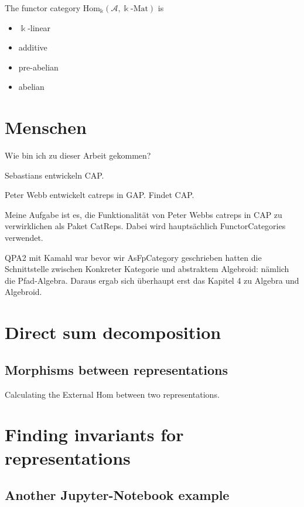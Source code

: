 \documentclass[12pt,compress]{beamer}
\begin{document}
\begin{frame}[fragile]
The functor category $\mathrm{Hom}_{\Bbbk}(\mathcal{A},\Bbbk\text{-}\mathrm{Mat})$ is
\begin{itemize}[<+->]
\item $\Bbbk$-linear
\item additive
\item pre-abelian
\item abelian
\end{itemize}
\end{frame}



\section{Menschen}

Wie bin ich zu dieser Arbeit gekommen?

Sebastians entwickeln CAP.

Peter Webb entwickelt catreps in GAP. Findet CAP.

Meine Aufgabe ist es, die Funktionalität von Peter Webbs catreps in CAP
zu verwirklichen als Paket CatReps. Dabei wird hauptsächlich FunctorCategories
verwendet.

QPA2 mit Kamahl war bevor wir AsFpCategory geschrieben hatten die Schnittstelle zwischen
Konkreter Kategorie und abstraktem Algebroid: nämlich die Pfad-Algebra. Daraus ergab sich
überhaupt erst das Kapitel 4 zu Algebra und Algebroid.


\section{Direct sum decomposition}

\subsection{Morphisms between representations}

\begin{frame}
Calculating the External Hom between two representations.
\end{frame}

\section{Finding invariants for representations}

\subsection{Another Jupyter-Notebook example}
\end{document}
